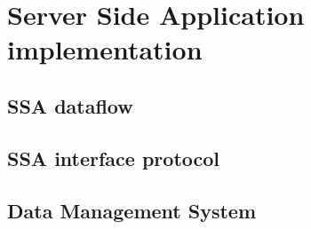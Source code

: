 \section{Server Side Application implementation}
\label{sec:ssa_implementation}



\subsection{SSA dataflow}
\label{sec:api_architecture}


\subsection{SSA interface protocol}
\label{sec:api_protocol}


\subsection{Data Management System}
\label{sec:dms_implementation}
